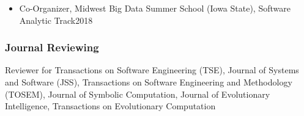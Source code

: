 \documentclass[11pt]{article}
\newcommand{\beforegmu}{\textbf{Before GMU}}
\begin{document}
\begin{itemize}
    \item Co-Organizer, Midwest Big Data Summer School (Iowa State), Software Analytic Track\hfill 2018
\end{itemize}


\subsubsection{Journal Reviewing}
\begin{description}
    \item Reviewer for  Transactions on Software Engineering (TSE), Journal of Systems and Software (JSS), Transactions on Software Engineering and Methodology (TOSEM), Journal of Symbolic Computation, Journal of Evolutionary Intelligence, Transactions on Evolutionary Computation
\end{description}



\newcommand{\myunitservices}{
\begin{itemize}
    \item Program Director, MS Software Engineering\hfill 2023--current
    \item Member, Dept. Chair Renewal Committee\hfill 2024
    \item Member, Web Committee\hfill 2022--current
    \begin{itemize}
        \item Co-Lead CS Web Site Migration Committee\hfill 2024
    \end{itemize}
    \item Member, MS Software Engineering Admission Committee \hfill 2023--current
    \item Member, Executive Committee\hfill 2022--2023
    \item Member, PhD Admission Committee \hfill 2021--current
    \begin{description}[before=\small]
        \item Co-organize Virtual Open House (VOH) events\hfill 2021--2023
        \item Create VOH'23 website (\url{https://cs-gmu.github.io/cs-phd-voh-s23/})
    \end{description}
\end{itemize}
\vspace{0.1in}
\beforegmu{} (At UNL)
\vspace{0.1in}
\begin{itemize}
    \item Member, Graduate CS Program Committee\hfill 2020--2021
    \item Member, Faculty Search Committee\hfill 2019--2020
    \item Member, Awards Committee\hfill 2018--2019
    \item Member, Software Engineering Search Committee\hfill 2018--2019
    \item Member, Graduate Recruitment\hfill 2018
    \item Member, Graduate Admission\hfill 2016--2020
    \item Member, Qualifying Exam Committee-Theory Track\hfill 2016--2018
\end{itemize}
}
\end{document}
